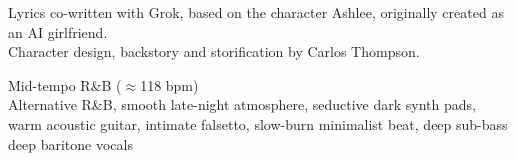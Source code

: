 

\begin{notes}
Lyrics co-written with Grok, based on the character Ashlee, originally created as an AI girlfriend.\newline\\
Character design, backstory and storification by Carlos Thompson.
\end{notes}

\begin{style}
Mid-tempo R\&B (\(\approx\)118 bpm)\\
Alternative R\&B, smooth late-night atmosphere, seductive dark synth pads, warm acoustic guitar, intimate falsetto, slow-burn minimalist beat, deep sub-bass\\
deep baritone vocals
\end{style}

